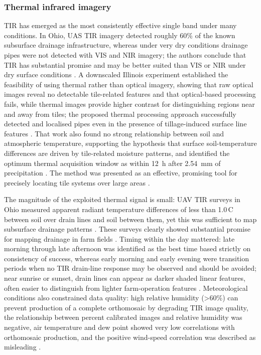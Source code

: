 \subsubsection{Thermal infrared imagery}

TIR has emerged as the most consistently effective single band under many conditions. In Ohio, UAS TIR imagery detected roughly 60\% of the known subsurface drainage infrastructure, whereas under very dry conditions drainage pipes were not detected with VIS and NIR imagery; the authors conclude that TIR has substantial promise and may be better suited than VIS or NIR under dry surface conditions \parencite{Allred2018}. A downscaled Illinois experiment established the feasibility of using thermal rather than optical imagery, showing that raw optical images reveal no detectable tile-related features and that optical-based processing fails, while thermal images provide higher contrast for distinguishing regions near and away from tiles; the proposed thermal processing approach successfully detected and localised pipes even in the presence of tillage-induced surface line features \parencite{Woo2019}. That work also found no strong relationship between soil and atmospheric temperature, supporting the hypothesis that surface soil-temperature differences are driven by tile-related moisture patterns, and identified the optimum thermal acquisition window as within 12~h after 2.54~mm of precipitation \parencite{Woo2019}. The method was presented as an effective, promising tool for precisely locating tile systems over large areas \parencite{Woo2019}.

The magnitude of the exploited thermal signal is small: UAV TIR surveys in Ohio measured apparent radiant temperature differences of less than 1.0\,\textdegree C between soil over drain lines and soil between them, yet this was sufficient to map subsurface drainage patterns \parencite{Allred2021}. These surveys clearly showed substantial promise for mapping drainage in farm fields \parencite{Allred2021}. Timing within the day mattered: late morning through late afternoon was identified as the best time based strictly on consistency of success, whereas early morning and early evening were transition periods when no TIR drain-line response may be observed and should be avoided; near sunrise or sunset, drain lines can appear as darker shaded linear features, often easier to distinguish from lighter farm-operation features \parencite{Allred2021}. Meteorological conditions also constrained data quality: high relative humidity (>60\%) can prevent production of a complete orthomosaic by degrading TIR image quality, the relationship between percent calibrated images and relative humidity was negative, air temperature and dew point showed very low correlations with orthomosaic production, and the positive wind-speed correlation was described as misleading \parencite{Allred2021}.

